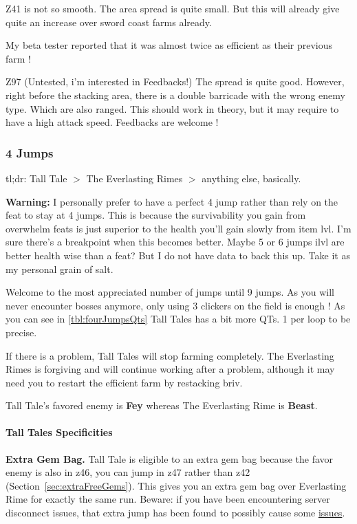 \documentclass{article}
\begin{document}
Z41 is not so smooth.
The area spread is quite small.
But this will already give quite an increase over sword coast farms already.

My beta tester reported that it was almost twice as efficient as their previous farm !

Z97 (Untested, i'm interested in Feedbacks!)
The spread is quite good.
However, right before the stacking area, there is a double barricade with the wrong enemy type.
Which are also ranged.
This should work in theory, but it may require to have a high attack speed.
Feedbacks are welcome !


\subsubsection{4 Jumps}

tl;dr: Tall Tale $>$ The Everlasting Rimes $>$ anything else, basically.

\textbf{Warning:} I personally prefer to have a perfect 4 jump rather than rely on the feat to stay at 4 jumps.
This is because the survivability you gain from overwhelm feats is just superior to the health you'll gain slowly from item lvl.
I'm sure there's a breakpoint when this becomes better.
Maybe 5 or 6 jumps ilvl are better health wise than a feat? 
But I do not have data to back this up.
Take it as my personal grain of salt.

Welcome to the most appreciated number of jumps until 9 jumps.
As you will never encounter bosses anymore, only using 3 clickers on the field is enough !
As you can see in \ref{tbl:fourJumpsQts} Tall Tales has a bit more QTs.
1 per loop to be precise.

If there is a problem, Tall Tales will stop farming completely.
The Everlasting Rimes is forgiving and will continue working after a problem, although it may need you to restart the efficient farm by restacking briv.

Tall Tale's favored enemy is \textbf{Fey} whereas The Everlasting Rime is \textbf{Beast}.

\paragraph{Tall Tales Specificities}

\textbf{Extra Gem Bag.}
Tall Tale is eligible to an extra gem bag because the favor enemy is also in z46, you can jump in z47 rather than z42 (Section~\ref{sec:extraFreeGems}).
This gives you an extra gem bag over Everlasting Rime for exactly the same run.
Beware: if you have been encountering server disconnect issues, that extra jump has been found to possibly cause some \href{https://discord.com/channels/357247482247380994/808221941722906655/1004051568145989733}{issues}.
\end{document}
